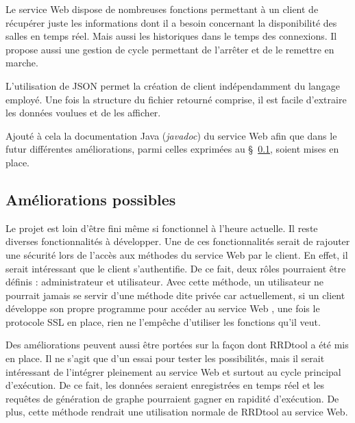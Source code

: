 Le service Web dispose de nombreuses fonctions permettant \`a un client de r\'ecup\'erer juste les informations dont il a besoin concernant la disponibilit\'e des salles en temps r\'eel.
Mais aussi les historiques dans le temps des connexions.
Il propose aussi une gestion de cycle permettant de l'arr\^eter et de le remettre en marche.

L'utilisation de JSON permet la cr\'eation de client ind\'ependamment du langage employ\'e.
Une fois la structure du fichier retourn\'e comprise, il est facile d'extraire les donn\'ees voulues et de les afficher.

Ajout\'e \`a cela la documentation Java (\textit{javadoc}) du service Web afin que dans le futur diff\'erentes am\'eliorations, parmi celles exprim\'ees au \S~\ref{section:amelioration}, soient mises en place.

\subsection{Am\'eliorations possibles}
\label{section:amelioration}

Le projet {\YuukouII} est loin d'\^etre fini m\^eme si fonctionnel \`a l'heure actuelle.
Il reste diverses fonctionnalit\'es \`a d\'evelopper.
Une de ces fonctionnalit\'es serait de rajouter une s\'ecurit\'e lors de l'acc\`es aux m\'ethodes du service Web par le client.
En effet, il serait int\'eressant que le client s'authentifie.
De ce fait, deux r\^oles pourraient \^etre d\'efinis : administrateur et utilisateur.
Avec cette m\'ethode, un utilisateur ne pourrait jamais se servir d'une m\'ethode dite priv\'ee car actuellement, si un client d\'eveloppe son propre programme pour acc\'eder au service Web {\YuukouII}, une fois le protocole SSL en place, rien ne l'emp\^eche d'utiliser les fonctions qu'il veut.

Des am\'eliorations peuvent aussi \^etre port\'ees sur la fa\c{c}on dont RRDtool a \'et\'e mis en place.
Il ne s'agit que d'un essai pour tester les possibilit\'es, mais il serait int\'eressant de l'int\'egrer pleinement au service Web et surtout au cycle principal d'ex\'ecution.
De ce fait, les donn\'ees seraient enregistr\'ees en temps r\'eel et les requ\^etes de g\'en\'eration de graphe pourraient gagner en rapidit\'e d'ex\'ecution.
De plus, cette m\'ethode rendrait une utilisation normale de RRDtool au service Web.


